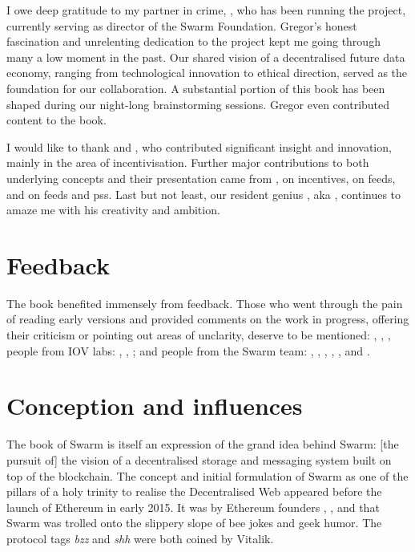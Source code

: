I owe deep gratitude to my partner in crime, , who has been running the project, currently serving as director of the Swarm Foundation. Gregor's honest fascination and unrelenting dedication to the project kept me going through many a low moment in the past. Our shared vision of a decentralised future data economy, ranging from technological innovation to ethical direction, served as the foundation for our collaboration. A substantial portion of this book has been shaped during our night-long brainstorming sessions. Gregor even contributed content to the book.

I would like to thank  and , who contributed significant insight and innovation, mainly in the area of incentivisation. 
Further major contributions to both underlying concepts and their presentation came from ,  on incentives,  
 on feeds, and  on feeds and pss. Last but not least, our resident genius , aka ,
continues to amaze me with his creativity and ambition.

\section*{Feedback}

The book benefited immensely from feedback. Those who went through the pain of reading early versions and provided comments on the work in progress, offering their criticism or pointing out areas of unclarity, deserve to be mentioned: , , ,  people from IOV labs:  , , ;
and people from the Swarm team:
, 
, ,  , , and .



\section*{Conception and influences}

The book of Swarm is itself an expression of the grand idea behind Swarm: [the pursuit of] the vision of a decentralised storage and messaging system built on top of the blockchain. The concept and initial formulation of Swarm as one of the pillars of a holy trinity to realise the Decentralised Web appeared before the launch of Ethereum in early 2015. It was by Ethereum founders , , and  that Swarm was trolled onto the slippery slope of bee jokes and geek humor. The protocol tags \emph{bzz} and \emph{shh} were both coined by Vitalik. 

